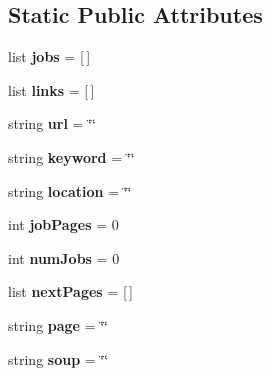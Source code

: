 \subsection*{Static Public Attributes}
\begin{DoxyCompactItemize}
\item 
\mbox{\label{classindeed_1_1Indeed_a4ce3932a3cdc9e325a04f257954476f0}} 
list {\bfseries jobs} = \mbox{[}$\,$\mbox{]}
\item 
\mbox{\label{classindeed_1_1Indeed_a8fe8e3e57c1b3710fb44a6056d0ac725}} 
list {\bfseries links} = \mbox{[}$\,$\mbox{]}
\item 
\mbox{\label{classindeed_1_1Indeed_af81a582e300bbe2d7859a5eaddbf236b}} 
string {\bfseries url} = \char`\"{}\char`\"{}
\item 
\mbox{\label{classindeed_1_1Indeed_aa3636e98fb04e01599744b879d66435a}} 
string {\bfseries keyword} = \char`\"{}\char`\"{}
\item 
\mbox{\label{classindeed_1_1Indeed_aa8fa887e129d84137726500e7a2c5623}} 
string {\bfseries location} = \char`\"{}\char`\"{}
\item 
\mbox{\label{classindeed_1_1Indeed_a650fa6601825564f4f14bb8115c7972c}} 
int {\bfseries job\+Pages} = 0
\item 
\mbox{\label{classindeed_1_1Indeed_a1d8618a35a56cdf30dd7edd76c0728e3}} 
int {\bfseries num\+Jobs} = 0
\item 
\mbox{\label{classindeed_1_1Indeed_a0bd469941af9edc2166bbf815083de67}} 
list {\bfseries next\+Pages} = \mbox{[}$\,$\mbox{]}
\item 
\mbox{\label{classindeed_1_1Indeed_a00b40f014b3bd66c1735017a708e1500}} 
string {\bfseries page} = \char`\"{}\char`\"{}
\item 
\mbox{\label{classindeed_1_1Indeed_af181aa95bfc49950cc9d10d440dc76e8}} 
string {\bfseries soup} = \char`\"{}\char`\"{}
\end{DoxyCompactItemize}



